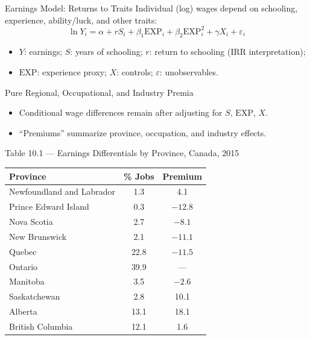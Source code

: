 \documentclass[aspectratio=169]{beamer}
\begin{document}
\begin{frame}{Earnings Model: Returns to Traits}
\transfade
\small
Individual (log) wages depend on schooling, experience, ability/luck, and other traits:
\[
\ln Y_i = \alpha + r S_i + \beta_1 \mathrm{EXP}_i + \beta_2 \mathrm{EXP}_i^2 + \gamma X_i + \varepsilon_i
\]
\begin{itemize}[<+->]
  \item $Y$: earnings;\; $S$: years of schooling;\; $r$: return to schooling (IRR interpretation);
  \item $\mathrm{EXP}$: experience proxy;\; $X$: controls;\; $\varepsilon$: unobservables.
\end{itemize}
\end{frame}

\begin{frame}{Pure Regional, Occupational, and Industry Premia}
\transfade
\begin{itemize}[<+->]
  \item Conditional wage differences remain after adjusting for $S$, $\mathrm{EXP}$, $X$.
  \item “Premiums” summarize province, occupation, and industry effects.
\end{itemize}
\end{frame}

\begin{frame}{Table 10.1 — Earnings Differentials by Province, Canada, 2015}
\transfade
\scriptsize
\begin{tabular}{lcc}
\toprule
\textbf{Province} & \textbf{\% Jobs} & \textbf{Premium} \\
\midrule
Newfoundland and Labrador & 1.3 & 4.1 \\
Prince Edward Island & 0.3 & $-12.8$ \\
Nova Scotia & 2.7 & $-8.1$ \\
New Brunswick & 2.1 & $-11.1$ \\
Quebec & 22.8 & $-11.5$ \\
Ontario & 39.9 & --- \\
Manitoba & 3.5 & $-2.6$ \\
Saskatchewan & 2.8 & 10.1 \\
Alberta & 13.1 & 18.1 \\
British Columbia & 12.1 & 1.6 \\
\bottomrule
\end{tabular}
\end{frame}
\end{document}

